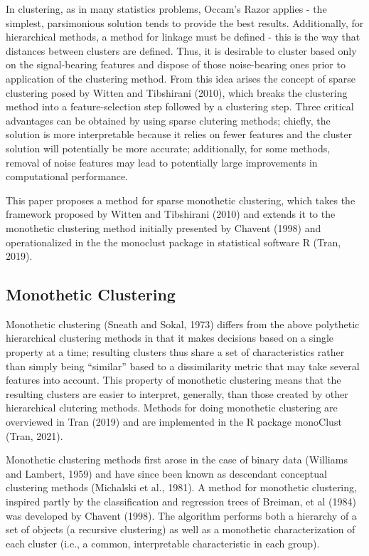 \documentclass[
]{article}
\begin{document}
In clustering, as in many statistics problems, Occam's Razor applies -
the simplest, parsimonious solution tends to provide the best results.
Additionally, for hierarchical methods, a method for linkage must be
defined - this is the way that distances between clusters are defined.
Thus, it is desirable to cluster based only on the signal-bearing
features and dispose of those noise-bearing ones prior to application of
the clustering method. From this idea arises the concept of sparse
clustering posed by Witten and Tibshirani (2010), which breaks the
clustering method into a feature-selection step followed by a clustering
step. Three critical advantages can be obtained by using sparse
clutering methods; chiefly, the solution is more interpretable because
it relies on fewer features and the cluster solution will potentially be
more accurate; additionally, for some methods, removal of noise features
may lead to potentially large improvements in computational performance.

This paper proposes a method for sparse monothetic clustering, which
takes the framework proposed by Witten and Tibshirani (2010) and extends
it to the monothetic clustering method initially presented by Chavent
(1998) and operationalized in the the monoclust package in statistical
software R (Tran, 2019).

\hypertarget{monothetic-clustering}{%
\subsection{Monothetic Clustering}\label{monothetic-clustering}}

Monothetic clustering (Sneath and Sokal, 1973) differs from the above
polythetic hierarchical clustering methods in that it makes decisions
based on a single property at a time; resulting clusters thus share a
set of characteristics rather than simply being ``similar'' based to a
dissimilarity metric that may take several features into account. This
property of monothetic clustering means that the resulting clusters are
easier to interpret, generally, than those created by other hierarchical
clutering methods. Methods for doing monothetic clustering are
overviewed in Tran (2019) and are implemented in the R package monoClust
(Tran, 2021).

Monothetic clustering methods first arose in the case of binary data
(Williams and Lambert, 1959) and have since been known as descendant
conceptual clustering methods (Michalski et al., 1981). A method for
monothetic clustering, inspired partly by the classification and
regression trees of Breiman, et al (1984) was developed by Chavent
(1998). The algorithm performs both a hierarchy of a set of objects (a
recursive clustering) as well as a monothetic characterization of each
cluster (i.e., a common, interpretable characteristic in each group).
\end{document}
